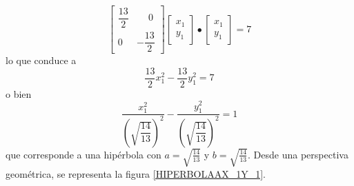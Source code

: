\begin{example}
{
    }
    $$\begin{bmatrix}
        \dfrac{13}{2} & \phantom{-} 0 \\[2mm]
        0 & - \dfrac{13}{2}
    \end{bmatrix} \begin{bmatrix}
        x_1 \\
        y_1
    \end{bmatrix} \bullet \begin{bmatrix}
        x_1 \\
        y_1
    \end{bmatrix} = 7$$
    lo que conduce a
    $$\frac{13}{2} x_1^2 - \frac{13}{2} y_1^2 = 7$$
    o bien
    $$\frac{x_1^2}{\left(\sqrt{\dfrac{14}{13}}\right)^2} - \frac{y_1^2}{\left(\sqrt{\dfrac{14}{13}}\right)^2} = 1$$
    que corresponde a una hipérbola con $\displaystyle a = \sqrt{\frac{14}{13}}$ y $\displaystyle b = \sqrt{\frac{14}{13}}$. Desde una perspectiva geométrica, se representa la figura \ref{HIPERBOLAAX_1Y_1}.
\end{example}


